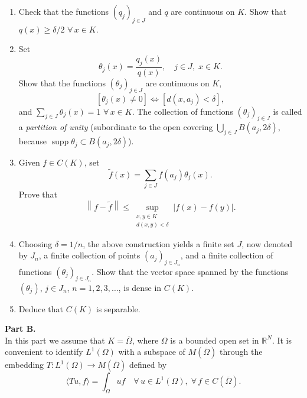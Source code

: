 \documentclass[12pt]{article}
\newcommand{\norm}[1]{\left\|#1\right\|}
\newcommand{\abs}[1]{\left|#1\right|}
\newcommand{\ip}[2]{\langle #1, #2 \rangle}
\newcommand{\R}{\mathbb{R}}
\begin{document}
\begin{enumerate}
\item Check that the functions $(q_j)_{j \in J}$ and $q$ are continuous on $K$. Show that
$q(x) \ge \delta/2$ $\forall\, x \in K$.
 
\item Set
\[
\theta_j(x) = \frac{q_j(x)}{q(x)}, \quad j \in J,\; x \in K.
\]
Show that the functions $(\theta_j)_{j \in J}$ are continuous on $K$,
\[
[\theta_j(x) \neq 0] \iff [d(x, a_j) < \delta],
\]
and $\sum_{j \in J} \theta_j(x) = 1$ $\forall\, x \in K$.
The collection of functions $(\theta_j)_{j \in J}$ is called a \emph{partition of unity} (subordinate to
the open covering $\bigcup_{j \in J} B(a_j, 2\delta)$, because $\operatorname{supp}\theta_j \subset B(a_j, 2\delta)$).
 
\item Given $f \in C(K)$, set
\[
\tilde{f}(x) = \sum_{j \in J} f(a_j)\theta_j(x).
\]
Prove that
\[
\norm{f - \tilde{f}} \le \sup_{\substack{x,y \in K \\ d(x,y) < \delta}} \abs{f(x) - f(y)}.
\]
 
\item Choosing $\delta = 1/n$, the above construction yields a finite set $J$, now denoted by
$J_n$, a finite collection of points $(a_j)_{j \in J_n}$, and a finite collection of functions
$(\theta_j)_{j \in J_n}$. Show that the vector space spanned by the functions $(\theta_j)$,
$j \in J_n$, $n = 1, 2, 3, \ldots$, is dense in $C(K)$.
 
\item Deduce that $C(K)$ is separable.
\end{enumerate}
 
\noindent\textbf{Part B.}\\
In this part we assume that $K = \overline{\Omega}$, where $\Omega$ is a bounded open set in $\R^N$.
It is convenient to identify $L^1(\Omega)$ with a subspace of $M(\overline{\Omega})$ through the embedding
$T : L^1(\Omega) \to M(\overline{\Omega})$ defined by
\[
\ip{Tu}{f} = \int_\Omega uf \quad \forall\, u \in L^1(\Omega),\; \forall\, f \in C(\overline{\Omega}).
\]
 
\end{document}
